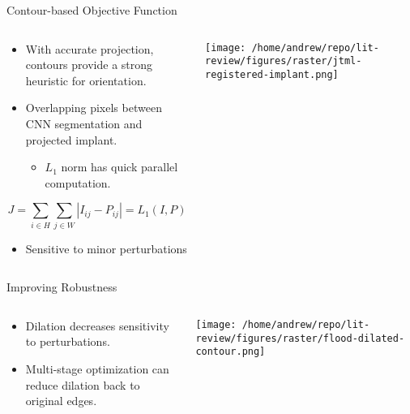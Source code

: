 \documentclass[presentation, aspectratio=1610]{beamer}
\begin{document}
\begin{frame}[label={sec:org2a8f913}]{Contour-based Objective Function}
\begin{columns}
\begin{column}{0.5\columnwidth}
\begin{itemize}
\item With accurate projection, contours provide a strong heuristic for orientation.
\item Overlapping pixels between CNN segmentation and projected implant.
\begin{itemize}
\item \(L_1\) norm has quick parallel computation.
\end{itemize}
\end{itemize}

\begin{equation*}
  J = \sum_{i \in H}\sum_{j \in W}|I_{ij} - P_{ij}| = L_{1}(I,P)
\end{equation*}

\begin{itemize}
\item Sensitive to minor perturbations
\end{itemize}
\end{column}
\begin{column}{0.6\columnwidth}
\begin{center}
\texttt{[image: /home/andrew/repo/lit-review/figures/raster/jtml-registered-implant.png]}
\end{center}
\end{column}
\end{columns}
\end{frame}
\begin{frame}[label={sec:orgf542ab6}]{Improving Robustness}
\begin{columns}
\begin{column}{0.5\columnwidth}
\begin{itemize}
\item Dilation decreases sensitivity to perturbations.
\item Multi-stage optimization can reduce dilation back to original edges.
\end{itemize}
\end{column}
\begin{column}{0.6\columnwidth}
\begin{center}
\texttt{[image: /home/andrew/repo/lit-review/figures/raster/flood-dilated-contour.png]}
\end{center}
\end{column}
\end{columns}
\end{frame}
\end{document}
